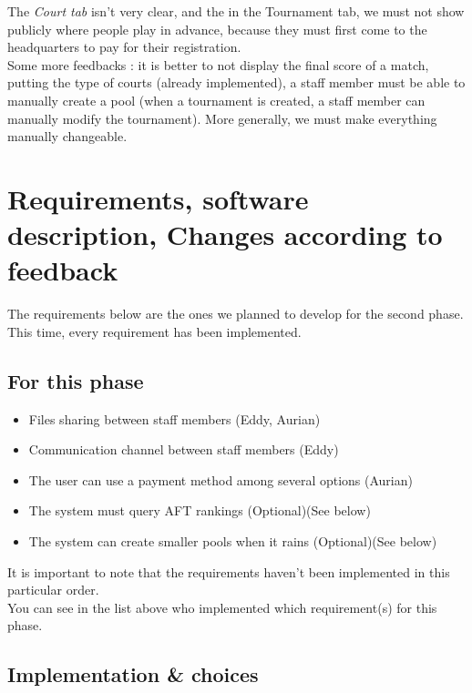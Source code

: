 \documentclass[a4paper, 12pt]{article}
\begin{document}
The \textit{Court tab} isn't very clear, and the in the Tournament tab, we must not show publicly where people play in advance, because they must first come to the headquarters to pay for their registration.\\

Some more feedbacks : it is better to not display the final score of a match, putting the type of courts (already implemented), a staff member must be able to manually create a pool (when a tournament is created, a staff member can manually modify the tournament). More generally, we must make everything manually changeable.
\newpage
\section{Requirements, software description, Changes according to feedback}

The requirements below are the ones we planned to develop for the second phase. This time, every requirement has been implemented. \\
\subsection{For this phase}
	
\begin{itemize}
 
\item Files sharing between staff members (Eddy, Aurian)
\item Communication channel between staff members (Eddy)
\item The user can use a payment method among several options (Aurian)
\item The system must query AFT rankings (Optional)(See below)
\item The system can create smaller pools when it rains (Optional)(See below)
\\
\end{itemize}

It is important to note that the requirements haven't been implemented in this particular order.\\

You can see in the list above who implemented which requirement(s) for this phase. 

\subsection*{Implementation \& choices}
\end{document}
